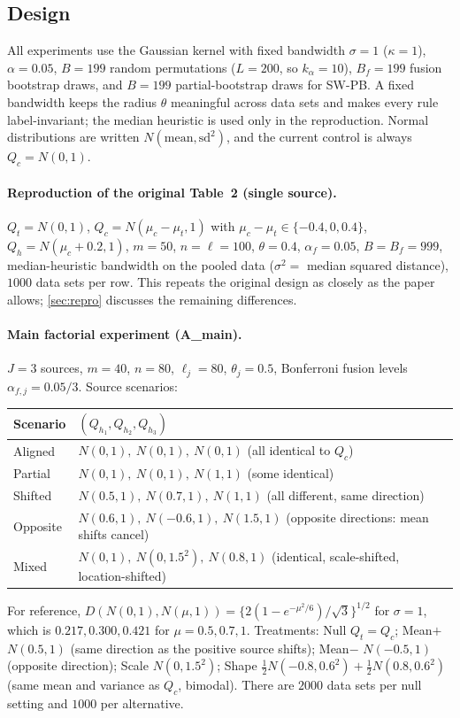 \subsection{Design}\label{sec:design}

All experiments use the Gaussian kernel with fixed bandwidth $\sigma=1$ ($\kappa=1$), $\alpha=0.05$, $B=199$ random permutations ($L=200$, so $k_\alpha=10$), $B_f=199$ fusion bootstrap draws, and $B=199$ partial-bootstrap draws for SW-PB. A fixed bandwidth keeps the radius $\theta$ meaningful across data sets and makes every rule label-invariant; the median heuristic is used only in the reproduction. Normal distributions are written $N(\text{mean},\text{sd}^2)$, and the current control is always $Q_c=N(0,1)$.

\paragraph{Reproduction of the original Table~2 (single source).} $Q_t=N(0,1)$, $Q_c=N(\mu_c-\mu_t,1)$ with $\mu_c-\mu_t\in\{-0.4,0,0.4\}$, $Q_h=N(\mu_c+0.2,1)$, $m=50$, $n=\ell=100$, $\theta=0.4$, $\alpha_f=0.05$, $B=B_f=999$, median-heuristic bandwidth on the pooled data ($\sigma^2=$ median squared distance), $1000$ data sets per row. This repeats the original design as closely as the paper allows; \cref{sec:repro} discusses the remaining differences.

\paragraph{Main factorial experiment (A\_main).} $J=3$ sources, $m=40$, $n=80$, $\ell_j=80$, $\theta_j=0.5$, Bonferroni fusion levels $\alpha_{f,j}=0.05/3$. Source scenarios:
\begin{center}\small
\begin{tabular}{@{}ll@{}}
\toprule
Scenario & $(Q_{h_1},Q_{h_2},Q_{h_3})$\\
\midrule
Aligned & $N(0,1),\ N(0,1),\ N(0,1)$ \quad (all identical to $Q_c$)\\
Partial & $N(0,1),\ N(0,1),\ N(1,1)$ \quad (some identical)\\
Shifted & $N(0.5,1),\ N(0.7,1),\ N(1,1)$ \quad (all different, same direction)\\
Opposite & $N(0.6,1),\ N(-0.6,1),\ N(1.5,1)$ \quad (opposite directions: mean shifts cancel)\\
Mixed & $N(0,1),\ N(0,1.5^2),\ N(0.8,1)$ \quad (identical, scale-shifted, location-shifted)\\
\bottomrule
\end{tabular}
\end{center}
For reference, $D(N(0,1),N(\mu,1))=\{2(1-e^{-\mu^2/6})/\sqrt3\}^{1/2}$ for $\sigma=1$, which is $0.217,0.300,0.421$ for $\mu=0.5,0.7,1$. Treatments: Null $Q_t=Q_c$; Mean$+$ $N(0.5,1)$ (same direction as the positive source shifts); Mean$-$ $N(-0.5,1)$ (opposite direction); Scale $N(0,1.5^2)$; Shape $\frac12N(-0.8,0.6^2)+\frac12N(0.8,0.6^2)$ (same mean and variance as $Q_c$, bimodal). There are $2000$ data sets per null setting and $1000$ per alternative.

